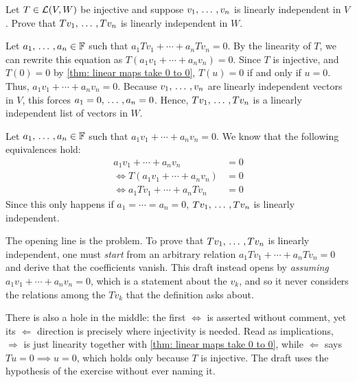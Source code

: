 \setcounter{xrcscount}{8}
\begin{xrcs}
  Let $T \in \mathcal{L}(V,W)$ be injective and suppose $v_1, {\, \ldots \,\,}, v_n$ is linearly independent in $V$. Prove that $Tv_1, {\, \ldots \,\,}, Tv_n$ is linearly independent in $W$.

  \begin{xprf}
    Let $a_1, {\, \ldots \,\,}, a_n \in \mathbb{F}$ such that
    $
    a_1 Tv_1 + \cdots + a_n Tv_n = 0.
    $
    By the linearity of $T$, we can rewrite this equation as
    $
    T(a_1 v_1 + \cdots + a_n v_n) = 0.
    $
    Since $T$ is injective, and $T(0)=0$ by \ref{thm: linear maps take 0 to 0}, $ T(u) = 0 $ if and only if $ u = 0 $. Thus,
    $
    a_1 v_1 + \cdots + a_n v_n = 0.
    $
    Because $v_1, {\, \ldots \,\,}, v_n$ are linearly independent vectors in $V$, this forces $a_1 = 0, {\, \ldots \,\,}, a_n = 0$.
    Hence, $Tv_1, {\, \ldots \,\,}, Tv_n$ is a linearly independent list of vectors in $W$.
  \end{xprf}

  \begin{failedattempt}
    Let $a_1, {\, \ldots \,\,}, a_n \in \mathbb{F}$ such that $a_1 v_1 + \cdots + a_n v_n = 0$.
    We know that the following equivalences hold:
    \begin{equation}
      \begin{aligned}
                a_1 v_1 + \cdots + a_n v_n  &= 0 \\
        \iff T (a_1 v_1 + \cdots + a_n v_n) &= 0 \\
        \iff a_1 T v_1 + \cdots + a_n T v_n &= 0
      \end{aligned}
    \end{equation}
    Since this only happens if $a_1 = \cdots = a_n = 0$, $T v_1, {\, \ldots \,\,}, T v_n$ is linearly independent.
  \end{failedattempt}

  \begin{ainote}
    The opening line is the problem. To prove that $Tv_1, {\, \ldots \,\,}, Tv_n$ is linearly independent, one must \emph{start} from an arbitrary relation $a_1 Tv_1 + \cdots + a_n Tv_n = 0$ and derive that the coefficients vanish. This draft instead opens by \emph{assuming} $a_1 v_1 + \cdots + a_n v_n = 0$, which is a statement about the $v_k$, and so it never considers the relations among the $Tv_k$ that the definition asks about.

    There is also a hole in the middle: the first $\iff$ is asserted without comment, yet its $\Leftarrow$ direction is precisely where injectivity is needed. Read as implications, $\Rightarrow$ is just linearity together with \ref{thm: linear maps take 0 to 0}, while $\Leftarrow$ says $T u = 0 \implies u = 0$, which holds only because $T$ is injective. The draft uses the hypothesis of the exercise without ever naming it.


\end{ainote}
\end{xrcs}
